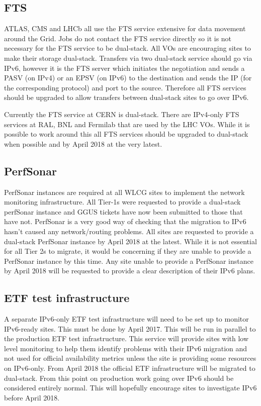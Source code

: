 \documentclass[a4paper]{jpconf}
\begin{document}
\subsection{FTS}
ATLAS, CMS and LHCb all use the FTS service extensive for data
movement around the Grid. Jobs do not contact the FTS service directly
so it is not necessary for the FTS service to be dual-stack. All VOs
are encouraging sites to make their storage dual-stack. Transfers via
two dual-stack service should go via IPv6, however it is the FTS
server which initiates the negotiation and sends a PASV (on IPv4) or
an EPSV (on IPv6) to the destination and sends the IP (for the
corresponding protocol) and port to the source.  Therefore all FTS
services should be upgraded to allow transfers between dual-stack
sites to go over IPv6.

Currently the FTS service at CERN is dual-stack. There are IPv4-only
FTS services at RAL, BNL and Fermilab that are used by the LHC VOs.
While it is possible to work around this all FTS services should be
upgraded to dual-stack when possible and by April 2018 at the very
latest.

\subsection{PerfSonar}
PerfSonar instances are required at all WLCG sites to implement the
network monitoring infrastructure. All Tier-1s were requested to
provide a dual-stack perfSonar instance and GGUS tickets have now been
submitted to those that have not. PerfSonar is a very good way of
checking that the migration to IPv6 hasn't caused any network/routing
problems. All sites are requested to provide a dual-stack PerfSonar
instance by April 2018 at the latest. While it is not essential for
all Tier 2s to migrate, it would be concerning if they are unable to
provide a PerfSonar instance by this time. Any site unable to provide
a PerfSonar instance by April 2018 will be requested to provide a
clear description of their IPv6 plans.

\subsection{ETF test infrastructure}
A separate IPv6-only ETF test infrastructure will need to be set up to
monitor IPv6-ready sites. This must be done by April 2017.  This will
be run in parallel to the production ETF test infrastructure. This
service will provide sites with low level monitoring to help them
identify problems with their IPv6 migration and not used for official
availability metrics unless the site is providing some resources on
IPv6-only. From April 2018 the official ETF infrastructure will be
migrated to dual-stack. From this point on production work going over
IPv6 should be considered entirely normal. This will hopefully
encourage sites to investigate IPv6 before April 2018.
\end{document}
